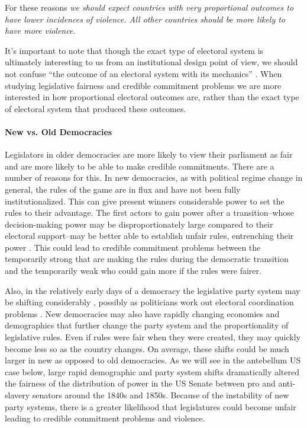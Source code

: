 \documentclass[a4paper]{article}\usepackage[]{graphicx}\usepackage[]{color}
\begin{document}
For these reasons \emph{we should expect countries with very proportional outcomes to have lower incidences of violence. All other countries should be more likely to have more violence.}

It's important to note that though the exact type of electoral system is ultimately interesting to us from an institutional design point of view, we should not confuse ``the outcome of an electoral system with its mechanics'' \citep[][109]{Golder2005}. When studying legislative fairness and credible commitment problems we are more interested in how proportional electoral outcomes are, rather than the exact type of electoral system that produced these outcomes.

\paragraph{New vs. Old Democracies}

Legislators in older democracies are more likely to view their parliament as fair and are more likely to be able to make credible commitments. There are a number of reasons for this. In new democracies, as with political regime change in general, the rules of the game are in flux and have not been fully institutionalized. This can give present winners considerable power to set the rules to their advantage. The first actors to gain power after a transition--whose decision-making power may be disproportionately large compared to their electoral support--may be better able to establish unfair rules, entrenching their power \cite[108]{Saideman2002}. This could lead to credible commitment problems between the temporarily strong that are making the rules during the democratic transition and the temporarily weak who could gain more if the rules were fairer.

Also, in the relatively early days of a democracy the legislative party system may be shifting considerably \cite[161 for a review]{Mainwaring2007b}, possibly as politicians work out electoral coordination problems \citep{cox1997}. New democracies may also have rapidly changing economies and demographics that further change the party system and the proportionality of legislative rules. Even if rules were fair when they were created, they may quickly become less so as the country changes. On average, these shifts could be much larger in new as opposed to old democracies. As we will see in the antebellum US case below, large rapid demographic and party system shifts dramatically altered the fairness of the distribution of power in the US Senate between pro and anti-slavery senators around the 1840s and 1850s. Because of the instability of new party systems, there is a greater likelihood that legislatures could become unfair leading to credible commitment problems and violence.
\end{document}
